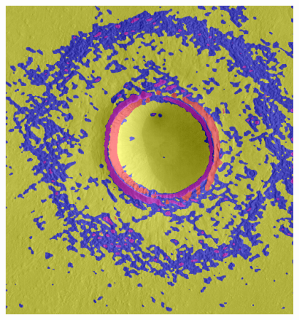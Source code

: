 \begin{table}[h!]
\begin{tabularx}{\textwidth}
		\includegraphics[width=.9\linewidth]{images/gen/filterbanks/Gre13_01.jpg_MR.png} \\
		

\end{tabularx}
\end{table}
